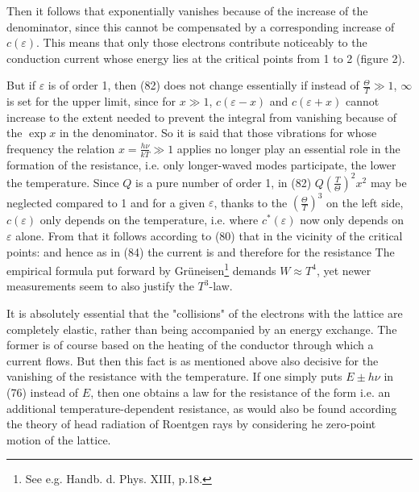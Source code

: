 \begin{paper}{1}
Then it follows that
exponentially vanishes because of the increase of the denominator, since this cannot be compensated by a corresponding increase of $c(\varepsilon)$. This means that only those electrons contribute noticeably to the conduction current whose energy lies at the critical points from 1 to 2 (figure 2).

But if $\varepsilon$ is of order 1, then (82) does not change essentially if instead of $\frac{\Theta}{T}\gg 1$, $\infty$ is set for the upper limit, since for $x\gg 1$, $c(\varepsilon-x)$ and $c(\varepsilon+x)$ cannot increase to the extent needed to prevent the integral from vanishing because of the $\exp{x}$ in the denominator. So it is said that those vibrations for whose frequency the relation $x=\frac{h\nu}{kT}\gg 1$ applies no longer play an essential role in the formation of the resistance, i.e. only longer-waved modes participate, the lower the temperature. Since $Q$ is a pure number of order 1, in (82) $Q\left(\frac{T}{\Theta}\right)^2 x^2$ may be neglected compared to 1 and for a given $\varepsilon$, thanks to the $\left(\frac{\Theta}{T}\right)^3$ on the left side, $c(\varepsilon)$ only depends on the temperature, i.e.
where $c^*(\varepsilon)$ now only depends on $\varepsilon$ alone. From that it follows according to (80) that in the vicinity of the critical points:
and hence as in (84) the current is
and therefore for the resistance
The empirical formula put forward by Gr\"uneisen\footnote{See e.g. Handb. d. Phys. XIII, p.18.} demands $W\approx T^4$, yet newer measurements seem to also justify the $T^3$-law.

It is absolutely essential that the "collisions" of the electrons with the lattice are completely elastic, rather than being accompanied by an energy exchange. The former is of course based on the heating of the conductor through which a current flows. But then this fact is as mentioned above also decisive for the vanishing of the resistance with the temperature. If one simply puts $E\pm h\nu$ in (76) instead of $E$, then one obtains a law for the resistance of the form
i.e. an additional temperature-dependent resistance, as would also be found according the theory of head radiation of Roentgen rays by considering he zero-point motion of the lattice.


\end{paper}
